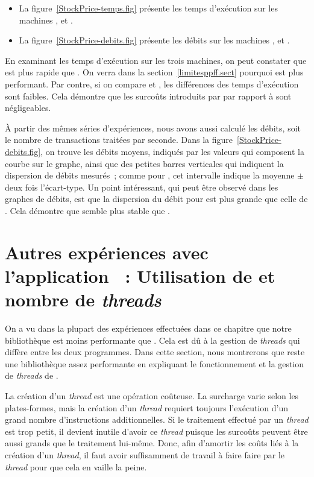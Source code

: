 \begin{itemize}

\item La figure~\ref{StockPrice-temps.fig} pr\'esente les temps d'ex\'ecution sur les machines ,  et .

\item La figure~\ref{StockPrice-debits.fig} pr\'esente les d\'ebits sur les machines ,  et .

\end{itemize}


En examinant les temps d'ex\'ecution sur les trois machines, on peut constater que  est plus rapide que . On verra dans la section~\ref{limitesppff.sect} pourquoi  est plus performant. Par contre, si on compare  et , les diff\'erences des temps d'ex\'ecution sont faibles. Cela d\'emontre que les surco\^uts introduits par  par rapport \`a  sont négligeables.

\`A partir des m\^emes s\'eries d'exp\'eriences, nous avons aussi calcul\'e les d\'ebits, soit le nombre de transactions trait\'ees par seconde. Dans la figure~\ref{StockPrice-debits.fig}, on trouve les d\'ebits moyens, indiqués par les valeurs qui composent la courbe sur le graphe, ainsi que des petites barres verticales qui indiquent la dispersion de débits mesurés~; comme pour , cet intervalle indique la moyenne $\pm$ deux fois l'écart-type. Un point int\'eressant, qui peut \^etre observ\'e dans les graphes de d\'ebits, est que la dispersion du d\'ebit pour  est plus grande que celle de . Cela d\'emontre que  semble plus stable que . 

\section{Autres expériences avec l'application ~: Utilisation de  et nombre de \emph{threads}} 
\label{autres-experiences-wordcount.sect}

On a vu dans la plupart des exp\'eriences effectu\'ees dans ce chapitre que notre biblioth\`eque  est moins performante que . Cela est d\^u \`a la gestion de \emph{threads} qui diff\`ere entre les deux programmes. Dans cette section, nous montrerons que  reste une biblioth\`eque assez performante en expliquant le fonctionnement et la gestion de \emph{threads} de . 

La cr\'eation d'un \emph{thread} est une opération co\^uteuse. La surcharge varie selon les plates-formes, mais la cr\'eation d'un \emph{thread} requiert toujours l'exécution d'un grand nombre d'instructions additionnelles. Si le traitement effectué par un \emph{thread} est trop petit, il devient inutile d'avoir ce \emph{thread} puisque les surcoûts peuvent être aussi grands que le traitement lui-même. Donc, afin d'amortir les co\^uts li\'es \`a la cr\'eation d'un \emph{thread}, il faut avoir suffisamment de travail à faire faire par le \emph{thread} pour que cela en vaille la peine.

